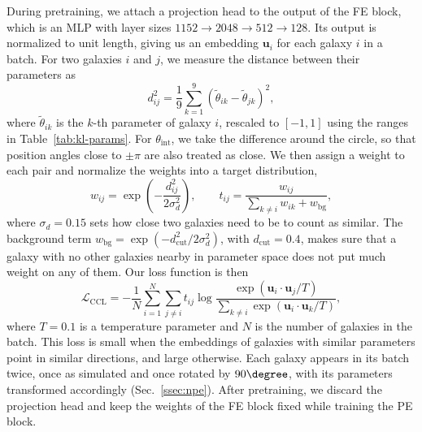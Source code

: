 During pretraining, we attach a projection head to the output of the FE block, which is an MLP with layer sizes $1152 \to 2048 \to 512 \to 128$. Its output is normalized to unit length, giving us an embedding $\mathbf{u}_i$ for each galaxy $i$ in a batch. For two galaxies $i$ and $j$, we measure the distance between their parameters as
\begin{equation}
\label{eqn:ccl-distance}
    d_{ij}^2 = \frac{1}{9}\sum_{k=1}^{9}\left(\tilde{\theta}_{ik} - \tilde{\theta}_{jk}\right)^2,
\end{equation}
where $\tilde{\theta}_{ik}$ is the $k$-th parameter of galaxy $i$, rescaled to $[-1, 1]$ using the ranges in Table~\ref{tab:kl-params}. For $\theta_\mathrm{int}$, we take the difference around the circle, so that position angles close to $\pm\pi$ are also treated as close. We then assign a weight to each pair and normalize the weights into a target distribution,
\begin{equation}
\label{eqn:ccl-target}
    w_{ij} = \exp\left(-\frac{d_{ij}^2}{2\sigma_d^2}\right), \qquad
    t_{ij} = \frac{w_{ij}}{\sum_{k\neq i} w_{ik} + w_\mathrm{bg}},
\end{equation}
where $\sigma_d = 0.15$ sets how close two galaxies need to be to count as similar. The background term $w_\mathrm{bg} = \exp\left(-d_\mathrm{cut}^2/2\sigma_d^2\right)$, with $d_\mathrm{cut}=0.4$, makes sure that a galaxy with no other galaxies nearby in parameter space does not put much weight on any of them. Our loss function is then
\begin{equation}
\label{eqn:ccl-loss}
    \mathcal{L}_\mathrm{CCL} = -\frac{1}{N}\sum_{i=1}^{N}\sum_{j\neq i} t_{ij}\log\frac{\exp(\mathbf{u}_i\cdot\mathbf{u}_j/T)}{\sum_{k\neq i}\exp(\mathbf{u}_i\cdot\mathbf{u}_k/T)},
\end{equation}
where $T=0.1$ is a temperature parameter and $N$ is the number of galaxies in the batch. This loss is small when the embeddings of galaxies with similar parameters point in similar directions, and large otherwise. Each galaxy appears in its batch twice, once as simulated and once rotated by $90\degree$, with its parameters transformed accordingly (Sec.~\ref{ssec:npe}). After pretraining, we discard the projection head and keep the weights of the FE block fixed while training the PE block.


